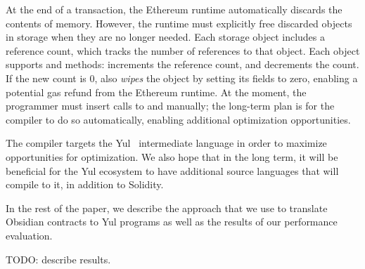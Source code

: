 At the end of a transaction, the Ethereum runtime automatically discards the contents of memory. However, the runtime must explicitly free discarded objects in storage when they are no longer needed. Each storage object includes a reference count, which tracks the number of references to that object. Each object supports  and  methods:  increments the reference count, and  decrements the count. If the new count is 0,  also \emph{wipes} the object by setting its fields to zero, enabling a potential gas refund from the Ethereum runtime. At the moment, the programmer must insert calls to  and  manually; the long-term plan is for the compiler to do so automatically, enabling additional optimization opportunities. 

The compiler targets the Yul~\cite{Yul} intermediate language in order to maximize opportunities for optimization. We also hope that in the long term, it will be beneficial for the Yul ecosystem to have additional source languages that will compile to it, in addition to Solidity.

In the rest of the paper, we describe the approach that we use to translate Obsidian contracts to Yul programs as well as the results of our performance evaluation.

TODO: describe results.